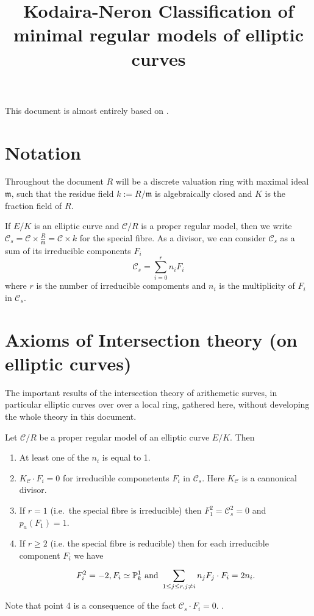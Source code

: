 \documentclass[a4paper]{article}
\title{Kodaira-Neron Classification of minimal regular models of elliptic curves}
\begin{document}
\maketitle
This document is almost entirely based on \cite[][\S 8]{silvermanAdvancedTopicsArithmetic1994}.

\section{Notation} \label{sec:notation}

Throughout the document $R$ will be a discrete valuation ring with maximal ideal $\mathfrak{m} $, such that the residue field $k := R / \mathfrak{m} $ is algebraically closed and $K$ is the fraction field of $R$. 

If $E / K$ is an elliptic curve and $\mathcal{C}  / R$ is a proper regular model, then we write $\mathcal{C} _s = \mathcal{C}  \times \frac{R}{\mathfrak{m} } = \mathcal{C} \times k $ for the special fibre. 
As a divisor, we can consider $\mathcal{C}_s$ as a sum of its irreducible components $F_i$ 
\begin{equation}\label{eq:decomposition_fibre}
	\mathcal{C}_s = \sum_{i = 0}^{r} n_i F_i
\end{equation}
where $r$ is the number of irreducible compoments and $n_i$ is the multiplicity of $F_i$ in $\mathcal{C} _s$. 

\section{Axioms of Intersection theory (on elliptic curves)} \label{sec:axioms_of_intersection_theory}

The important results of the intersection theory of arithemetic surves, in particular elliptic curves over over a local ring, gathered here, without developing the whole theory in this document. 

\begin{proposition}
	\label{prop:irred_comp_of_prop_model}
	Let $\mathcal{C} / R$  be a proper regular model of an elliptic curve $E / K$. Then 
	\begin{enumerate}
		\item At least one of the $n_i$ is equal to 1. 
		\item $K_{\mathcal{C} } \cdot F_i = 0 $ for irreducible componetents $F_i$ in $\mathcal{C} _s$. 
			Here $K_{\mathcal{C} }$ is a cannonical divisor. 
		\item If $r = 1$ (i.e.\ the special fibre is irreducible) then $F_1^2 = \mathcal{C} _s^2 = 0$ and $p_a (F_1) = 1$. 
		\item If $r \ge 2$ (i.e. the special fibre is reducible) then for each irreducible component $F_i$ we have \[
		F_i^2 = -2, F_i \simeq \mathbb{P}^{1}_k \text{ and } \sum_{1 \le j \le r, j \ne i}^{} n_j F_j\cdot  F_i = 2 n_i
		.\]   
	\end{enumerate}
\end{proposition}
Note that point 4 is a consequence of the fact $\mathcal{C} _s \cdot F_i = 0$.  .
\end{document}
